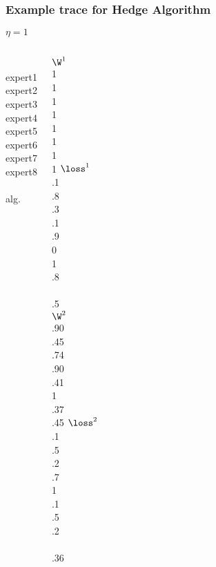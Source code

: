 \begin{frame} 
\frametitle{Example trace for Hedge Algorithm} 

$\eta=1$\\
\begin{columns} 
\column[t]{3cm}
~\\  expert1\\ expert2\\ expert3\\ expert4 \\ expert5\\ expert6\\ expert7\\ expert8 \\ ~\\ 
\color<2>{red} alg. 

\column[t]{1cm}
 $\W^1$ \\  1 \\  1  \\  1  \\  1  \\  1 \\  1 \\  1  \\  1 
\column[t]{1cm}
 $\loss^1$ \\ .1 \\ .8  \\ .3  \\ .1  \\ .9 \\  0 \\  1  \\ .8 \\ ~ \\
\color<5>{red} .5 \\

\column[t]{1cm}
 $\W^2$ \\  .90\\  .45\\.74 \\ .90 \\ .41\\  1 \\ .37 \\ .45 
\column[t]{1cm}
 $\loss^2$ \\ .1 \\ .5 \\ .2  \\ .7 \\ 1 \\  .1 \\  .5  \\ .2 \\ ~ \\
 .36 \\


\end{columns}
\end{frame}
